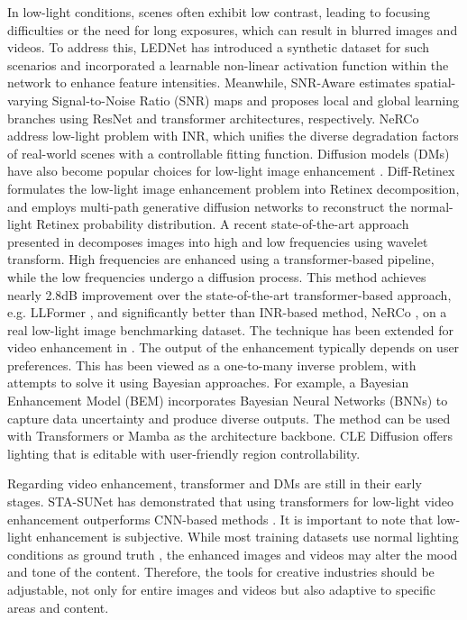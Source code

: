 \documentclass[11pt,a4paper]{article}
\begin{document}
In low-light conditions, scenes often exhibit low contrast, leading to focusing difficulties or the need for long exposures, which can result in blurred images and videos. To address this, LEDNet \cite{Zhou:LEDNet:2022} has introduced a synthetic dataset for such scenarios and incorporated a learnable non-linear activation function within the network to enhance feature intensities. Meanwhile, SNR-Aware \cite{Xu:SNR:2022} estimates spatial-varying Signal-to-Noise Ratio (SNR) maps and proposes local and global learning branches using ResNet and transformer architectures, respectively. NeRCo \cite{Yang:Implicit:2023} address low-light problem with INR, which unifies the diverse degradation factors of real-world scenes with a controllable fitting function.  Diffusion models (DMs) have also become popular choices for low-light image enhancement \cite{HOU:Global:2023,Yi:Diff:2023,Jiang:Low:2023}. Diff-Retinex \cite{Yi:Diff:2023} formulates the low-light image enhancement problem into Retinex decomposition, and employs multi-path generative diffusion networks to reconstruct the normal-light Retinex probability distribution. A recent state-of-the-art approach presented in \cite{Jiang:Low:2023} decomposes images into high and low frequencies using wavelet transform. High frequencies are enhanced using a transformer-based pipeline, while the low frequencies undergo a diffusion process. This method achieves nearly 2.8dB improvement over the state-of-the-art transformer-based approach, e.g. LLFormer \cite{Wang:Ultra:2023}, and significantly better than  INR-based method, NeRCo \cite{Yang:Implicit:2023}, on a real low-light image benchmarking dataset. The technique has been extended for video enhancement in \cite{lin2024lowlight}. The output of the enhancement typically depends on user preferences. This has been viewed as a one-to-many inverse problem, with attempts to solve it using Bayesian approaches. For example, a Bayesian Enhancement Model (BEM) \cite{huang2025bayesian} incorporates Bayesian Neural Networks (BNNs) to capture data uncertainty and produce diverse outputs. The method can be used with Transformers or Mamba as the architecture backbone. CLE Diffusion \cite{Yin:CLE:2023} offers lighting that is editable with user-friendly region controllability.

Regarding video enhancement, transformer and DMs are still in their early stages. STA-SUNet \cite{Lin:SPATIO:2024} has demonstrated that using transformers for low-light video enhancement outperforms CNN-based methods \cite{anantrasirichai:BVI:2024}. It is important to note that low-light enhancement is subjective. While most training datasets use normal lighting conditions as ground truth \cite{Lin:BVI-RLV:2024}, the enhanced images and videos may alter the mood and tone of the content. Therefore, the tools for creative industries should be adjustable, not only for entire images and videos but also adaptive to specific areas and content.
\end{document}
